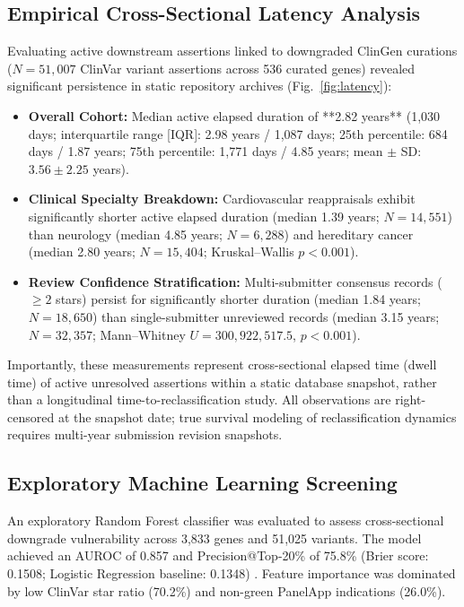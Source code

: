 \documentclass[conference]{IEEEtran}
\begin{document}
\subsection{Empirical Cross-Sectional Latency Analysis}
Evaluating active downstream assertions linked to downgraded ClinGen curations ($N = 51,007$ ClinVar variant assertions across 536 curated genes) revealed significant persistence in static repository archives (Fig.~\ref{fig:latency}):
\begin{itemize}
    \item \textbf{Overall Cohort:} Median active elapsed duration of **2.82 years** (1,030 days; interquartile range [IQR]: 2.98 years / 1,087 days; 25th percentile: 684 days / 1.87 years; 75th percentile: 1,771 days / 4.85 years; mean $\pm$ SD: $3.56 \pm 2.25$ years).
    \item \textbf{Clinical Specialty Breakdown:} Cardiovascular reappraisals exhibit significantly shorter active elapsed duration (median 1.39 years; $N = 14,551$) than neurology (median 4.85 years; $N = 6,288$) and hereditary cancer (median 2.80 years; $N = 15,404$; Kruskal--Wallis $p < 0.001$).
    \item \textbf{Review Confidence Stratification:} Multi-submitter consensus records ($\ge 2$ stars) persist for significantly shorter duration (median 1.84 years; $N = 18,650$) than single-submitter unreviewed records (median 3.15 years; $N = 32,357$; Mann--Whitney $U = 300,922,517.5$, $p < 0.001$).
\end{itemize}
Importantly, these measurements represent cross-sectional elapsed time (dwell time) of active unresolved assertions within a static database snapshot, rather than a longitudinal time-to-reclassification study. All observations are right-censored at the snapshot date; true survival modeling of reclassification dynamics requires multi-year submission revision snapshots.

\subsection{Exploratory Machine Learning Screening}
An exploratory Random Forest classifier was evaluated to assess cross-sectional downgrade vulnerability across 3,833 genes and 51,025 variants. The model achieved an AUROC of 0.857 and Precision@Top-20\% of 75.8\% (Brier score: 0.1508; Logistic Regression baseline: 0.1348) \cite{pedregosa2011scikit, wright2015ranger}. Feature importance was dominated by low ClinVar star ratio (70.2\%) and non-green PanelApp indications (26.0\%). 
\end{document}
